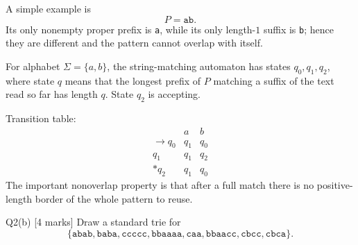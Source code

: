 \documentclass[10.5pt,a4paper]{article}
\begin{document}
\begin{answerbox}
A simple example is
\[
P=\texttt{ab}.
\]
Its only nonempty proper prefix is \texttt{a}, while its only length-$1$ suffix is \texttt{b}; hence they are different and the pattern cannot overlap with itself.

For alphabet $\Sigma=\{a,b\}$, the string-matching automaton has states $q_0,q_1,q_2$, where state $q$ means that the longest prefix of $P$ matching a suffix of the text read so far has length $q$. State $q_2$ is accepting.

\begin{center}
\end{center}

Transition table:
\[
\begin{array}{c|cc}
 & a & b\\ \hline
\to q_0&q_1&q_0\\
q_1&q_1&q_2\\
* q_2&q_1&q_0
\end{array}
\]
The important nonoverlap property is that after a full match there is no positive-length border of the whole pattern to reuse.
\end{answerbox}

\begin{questionbox}{Q2(b) [4 marks]}
Draw a standard trie for
\[
\{\texttt{abab},\texttt{baba},\texttt{ccccc},\texttt{bbaaaa},\texttt{caa},\texttt{bbaacc},\texttt{cbcc},\texttt{cbca}\}.
\]
\end{questionbox}
\end{document}
